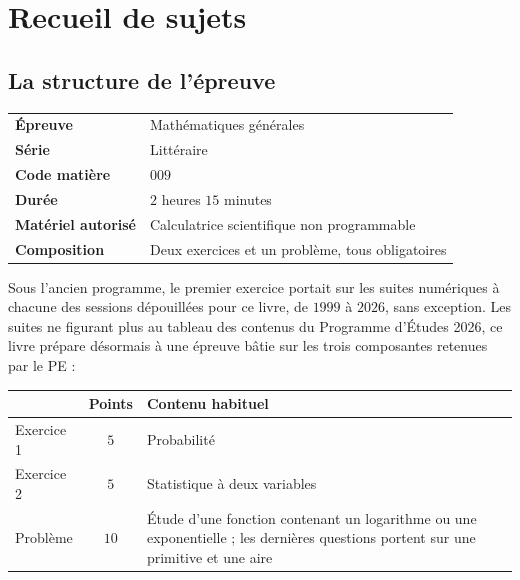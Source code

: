 \chapter{Recueil de sujets}

\section{La structure de l'épreuve}

\begin{center}
\renewcommand{\arraystretch}{1.4}
\begin{tabular}{|L{4.4cm}|L{7.4cm}|}
\hline
\textbf{Épreuve} & Mathématiques générales\\
\textbf{Série} & Littéraire\\
\textbf{Code matière} & $009$\\
\textbf{Durée} & $2$ heures $15$ minutes\\
\textbf{Matériel autorisé} & Calculatrice scientifique non programmable\\
\textbf{Composition} & Deux exercices et un problème, tous obligatoires\\
\hline
\end{tabular}
\end{center}

\noindent Sous l'ancien programme, le premier exercice portait sur les
suites numériques à chacune des sessions dépouillées pour ce livre, de
$1999$ à $2026$, sans exception. Les suites ne figurant plus au tableau des
contenus du Programme d'Études 2026, ce livre prépare désormais à une
épreuve bâtie sur les trois composantes retenues par le PE :

\begin{center}
\renewcommand{\arraystretch}{1.35}
\begin{tabular}{|L{4.2cm}|c|L{5.6cm}|}
\hline
 & \textbf{Points} & \textbf{Contenu habituel}\\
\hline
Exercice 1 & $5$ & Probabilité\\
Exercice 2 & $5$ & Statistique à deux variables\\
Problème & $10$ & Étude d'une fonction contenant un logarithme ou une
exponentielle ; les dernières questions portent sur une primitive et une
aire\\
\hline
\end{tabular}
\end{center}

